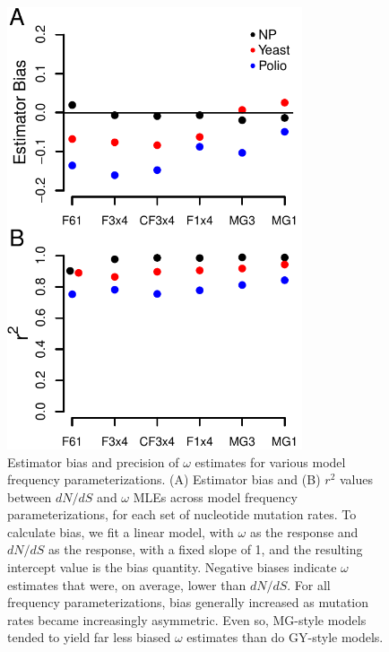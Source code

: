 \documentclass[11pt]{article}
\begin{document}
\begin{figure}[htbp]
	\centerline{\includegraphics[width=8.7cm]{figures/MainText/nyp_bias_r2.pdf}}
	\caption{\label{nyp_bias_r2} Estimator bias and precision of $\omega$ estimates for various model frequency parameterizations. (A) Estimator bias and (B) $r^2$ values between $dN/dS$ and $\omega$ MLEs across model frequency parameterizations, for each set of nucleotide mutation rates. To calculate bias, we fit a linear model, with $\omega$ as the response and $dN/dS$ as the response, with a fixed slope of 1, and the resulting intercept value is the bias quantity. Negative biases indicate $\omega$ estimates that were, on average, lower than $dN/dS$. For all frequency parameterizations, bias generally increased as mutation rates became increasingly asymmetric. Even so, MG-style models tended to yield far less biased $\omega$ estimates than do GY-style models.}	
\end{figure}

\vspace{2cm}
\end{document}
